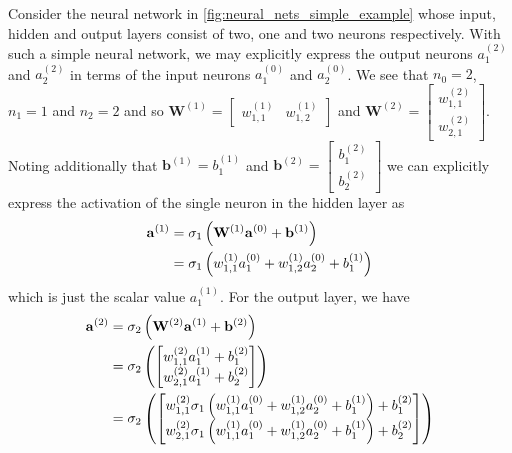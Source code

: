 \documentclass[11pt]{article}
\begin{document}
\begin{example}
    Consider the neural network in \autoref{fig:neural_nets_simple_example} whose input, hidden and output layers consist of two, one and two neurons respectively. With such a simple neural network, we may explicitly express the output neurons $a_1^{(2)}$ and $a_2^{(2)}$ in terms of the input neurons $a_1^{(0)}$ and $a_2^{(0)}$. We see that $n_0=2$, $n_1=1$ and $n_2=2$ and so
    $\mathbf{W}^{(1)}=
    \begin{bmatrix}
        w_{1,1}^{(1)} & w_{1,2}^{(1)}
    \end{bmatrix}
    $
    and
    $\mathbf{W}^{(2)}=
    \begin{bmatrix}
        w_{1,1}^{(2)}\\
        w_{2,1}^{(2)}
    \end{bmatrix}.
    $
    Noting additionally that $\mathbf{b}^{(1)}=b_1^{(1)}$ and
    $\mathbf{b}^{(2)}=
    \begin{bmatrix}
        b_{1}^{(2)}\\
        b_{2}^{(2)}
    \end{bmatrix}$
    we can explicitly express the activation of the single neuron in the hidden layer as
    \begin{align*}
    \mathbf{a}^{(1)}
    &=
    \sigma_1\left(\mathbf{W}^{(1)}\mathbf{a}^{(0)}+\mathbf{b}^{(1)}\right)\\
    &=
    \sigma_1\left(w_{1,1}^{(1)}a_1^{(0)}+w_{1,2}^{(1)}a_2^{(0)}+b_1^{(1)}\right)
    \end{align*}
    which is just the scalar value $a_1^{(1)}$. For the output layer, we have
    \begin{align*}
    \mathbf{a}^{(2)}
    &=
    \sigma_2\l(\mathbf{W}^{(2)}\mathbf{a}^{(1)}+\mathbf{b}^{(2)}\r)\\
    &=
    \sigma_2\l(
    \begin{bmatrix}
        w_{1,1}^{(2)}a_1^{(1)} + b_1^{(2)}\\
        w_{2,1}^{(2)}a_1^{(1)} + b_2^{(2)}
    \end{bmatrix}
    \r)\\
    &=
    \sigma_2\l(
    \begin{bmatrix}
        w_{1,1}^{(2)}\sigma_1\l(w_{1,1}^{(1)}a_1^{(0)}+w_{1,2}^{(1)}a_2^{(0)}+b_1^{(1)}\r) + b_1^{(2)}\\
        w_{2,1}^{(2)}\sigma_1\l(w_{1,1}^{(1)}a_1^{(0)}+w_{1,2}^{(1)}a_2^{(0)}+b_1^{(1)}\r) + b_2^{(2)}
    \end{bmatrix}
    \r)\\

\end{align*}
\end{example}
\end{document}
